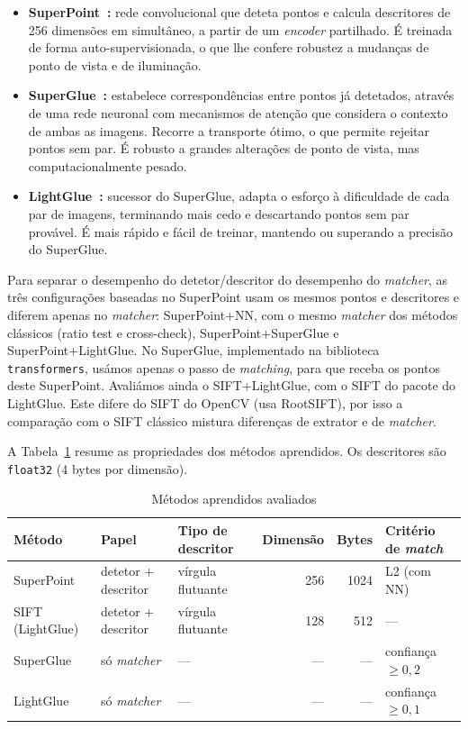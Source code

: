 \documentclass[11pt,a4paper]{article}
\begin{document}
\begin{itemize}

\item \textbf{SuperPoint~\cite{detone2018}:} rede convolucional que deteta pontos e calcula descritores de 256 dimensões em simultâneo, a partir de um \textit{encoder} partilhado. É treinada de forma auto-supervisionada, o que lhe confere robustez a mudanças de ponto de vista e de iluminação.

\item \textbf{SuperGlue~\cite{sarlin2020}:} estabelece correspondências entre pontos já detetados, através de uma rede neuronal com mecanismos de atenção que considera o contexto de ambas as imagens. Recorre a transporte ótimo, o que permite rejeitar pontos sem par. É robusto a grandes alterações de ponto de vista, mas computacionalmente pesado.

\item \textbf{LightGlue~\cite{lindenberger2023}:} sucessor do SuperGlue, adapta o esforço à dificuldade de cada par de imagens, terminando mais cedo e descartando pontos sem par provável. É mais rápido e fácil de treinar, mantendo ou superando a precisão do SuperGlue.

\end{itemize}

Para separar o desempenho do detetor/descritor do desempenho do \textit{matcher}, as três configurações baseadas no SuperPoint usam os mesmos pontos e descritores e diferem apenas no \textit{matcher}: SuperPoint+NN, com o mesmo \textit{matcher} dos métodos clássicos (ratio test e cross-check), SuperPoint+SuperGlue e SuperPoint+LightGlue. No SuperGlue, implementado na biblioteca \texttt{transformers}, usámos apenas o passo de \textit{matching}, para que receba os pontos deste SuperPoint. Avaliámos ainda o SIFT+LightGlue, com o SIFT do pacote do LightGlue. Este difere do SIFT do OpenCV (usa RootSIFT), por isso a comparação com o SIFT clássico mistura diferenças de extrator e de \textit{matcher}.

A Tabela~\ref{tab:aprendidos} resume as propriedades dos métodos aprendidos. Os descritores são \texttt{float32} (4 bytes por dimensão).

\begin{table}[H]
\centering\small
\caption{Métodos aprendidos avaliados}
\label{tab:aprendidos}
\begin{tabular}{lllrrl}
\toprule
Método & Papel & Tipo de descritor & Dimensão & Bytes & Critério de \textit{match} \\
\midrule
SuperPoint       & detetor + descritor & vírgula flutuante & 256 & 1024 & L2 (com NN) \\
SIFT (LightGlue) & detetor + descritor & vírgula flutuante & 128 & 512 & --- \\
SuperGlue        & só \textit{matcher} & --- & --- & --- & confiança $\geq 0{,}2$ \\
LightGlue        & só \textit{matcher} & --- & --- & --- & confiança $\geq 0{,}1$ \\
\bottomrule
\end{tabular}
\end{table}
\end{document}
